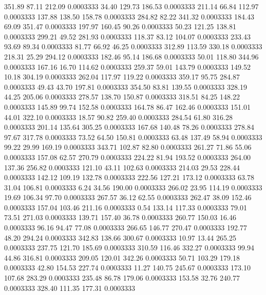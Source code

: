  351.89   87.11  212.09   0.0003333
  34.40  129.73  186.53   0.0003333
 211.14   66.84  112.97   0.0003333
 137.88  138.50  158.78   0.0003333
 284.82   82.22  341.32   0.0003333
 184.43   69.09  351.47   0.0003333
 197.97  160.45   90.26   0.0003333
  50.23  121.25  138.81   0.0003333
 299.21   49.52  281.93   0.0003333
 118.37   83.12  104.07   0.0003333
 233.43   93.69   89.34   0.0003333
  81.77   66.92   46.25   0.0003333
 312.89  113.59  330.18   0.0003333
 218.31   25.29  294.12   0.0003333
 182.46   95.14  186.68   0.0003333
  50.01  118.80  344.96   0.0003333
 167.16   16.70  114.62   0.0003333
 259.37   59.01  143.79   0.0003333
 149.52   10.18  304.19   0.0003333
 262.04  117.97  119.22   0.0003333
 359.17   95.75  284.87   0.0003333
  49.43   43.70  197.81   0.0003333
 354.50   83.81  139.55   0.0003333
 328.19   44.25  205.06   0.0003333
 278.57  138.70  150.87   0.0003333
 318.51   84.25  148.22   0.0003333
 145.89   99.74  152.58   0.0003333
 164.78   86.47  162.46   0.0003333
 151.01   44.01  322.10   0.0003333
  18.57   90.82  259.40   0.0003333
 284.54   61.80  316.28   0.0003333
 201.14  135.64  305.25   0.0003333
 167.68  140.48   78.26   0.0003333
 278.84   97.67  317.78   0.0003333
  73.52   64.50  150.81   0.0003333
  63.48  137.49   58.94   0.0003333
  99.22   29.99  169.19   0.0003333
 343.71  102.87   82.80   0.0003333
 261.27   71.86   55.06   0.0003333
 157.08   62.57  270.79   0.0003333
 224.22   81.94  193.52   0.0003333
 264.00  137.36  256.82   0.0003333
 121.10   43.11  102.63   0.0003333
 214.03   29.53  228.44   0.0003333
 142.12  109.19  132.78   0.0003333
 222.56  127.21  173.12   0.0003333
  63.78   31.04  106.81   0.0003333
   6.24   34.56  190.00   0.0003333
 266.02   23.95  114.19   0.0003333
  19.69  106.34   97.70   0.0003333
 267.57   36.12   62.55   0.0003333
 262.47   38.09  152.46   0.0003333
 157.04  103.46  211.16   0.0003333
   0.54  133.14  117.33   0.0003333
  79.01   73.51  271.03   0.0003333
 139.71  157.40   36.78   0.0003333
 260.77  150.03   16.46   0.0003333
  96.16   94.47   77.08   0.0003333
 266.65  146.77  270.47   0.0003333
 192.77   48.20  294.24   0.0003333
 342.83  138.66  300.67   0.0003333
  10.97   13.44  265.25   0.0003333
 237.75  121.70  185.69   0.0003333
 310.59  116.46  332.27   0.0003333
  99.94   44.86  316.81   0.0003333
 209.05  120.01  342.26   0.0003333
  50.71  103.29  179.18   0.0003333
  42.80  154.53  227.74   0.0003333
  11.27  140.75  245.67   0.0003333
 173.10  107.68  283.29   0.0003333
 235.48   86.78  179.06   0.0003333
 153.58   32.76  240.77   0.0003333
 328.40  111.35  177.31   0.0003333

